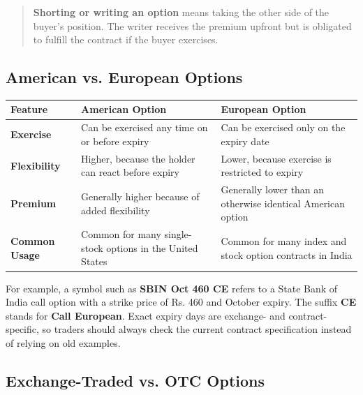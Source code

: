 \documentclass[12pt,openany]{book}
\begin{document}
\begin{quote}
\textbf{Shorting or writing an option} means taking the other side of the buyer's position. The writer receives the premium upfront but is obligated to fulfill the contract if the buyer exercises.
\end{quote}

\subsection{American vs. European Options}

\begin{center}
\small
\begin{tabular}{|L{3.2cm}|L{5.5cm}|L{5.5cm}|}
\hline
\textbf{Feature} & \textbf{American Option} & \textbf{European Option} \\
\hline
\textbf{Exercise} & Can be exercised any time on or before expiry & Can be exercised only on the expiry date \\
\hline
\textbf{Flexibility} & Higher, because the holder can react before expiry & Lower, because exercise is restricted to expiry \\
\hline
\textbf{Premium} & Generally higher because of added flexibility & Generally lower than an otherwise identical American option \\
\hline
\textbf{Common Usage} & Common for many single-stock options in the United States & Common for many index and stock option contracts in India \\
\hline
\end{tabular}
\end{center}

For example, a symbol such as \textbf{SBIN Oct 460 CE} refers to a State Bank of India call option with a strike price of Rs. 460 and October expiry. The suffix \textbf{CE} stands for \textbf{Call European}. Exact expiry days are exchange- and contract-specific, so traders should always check the current contract specification instead of relying on old examples.

\subsection{Exchange-Traded vs. OTC Options}
\end{document}

